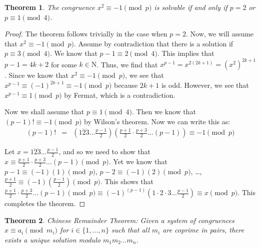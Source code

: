 \documentclass[psamsfonts]{amsart}
\newtheorem{thm}{Theorem}[section]
\theoremstyle{definition}
\theoremstyle{remark}
\numberwithin{equation}{section}
\begin{document}
\begin{thm}
The congruence $x^2 \equiv - 1 \pmod{p}$ is solvable if and only if $p = 2$ or $p \equiv 1 \pmod{4}$. 
\end{thm}

\begin{proof}
The theorem follows trivially in the case when $p = 2$. Now, we will assume that $x^2 \equiv -1 \pmod{p}$. Assume by contradiction that there is a solution if $p \equiv 3 \pmod{4}$. We know that $p-1 \equiv 2 \pmod{4}$. This implies that $p-1 = 4k + 2$ for some $k \in \mathrm{N}$. Thus, we find that $x^{p-1} = x^{2(2k+1)} = (x^2)^{2k+1}$. Since we know that $x^2 \equiv -1 \pmod{p}$, we see that $x^{p-1} \equiv (-1)^{2k+1} \equiv -1 \pmod{p}$ because $2k+1$ is odd. However, we see that $x^{p-1} \equiv 1 \pmod{p}$ by Fermat, which is a contradiction.

Now we shall assume that $p \equiv 1 \pmod{4}$. Then we know that $(p-1)! \equiv - 1 \pmod{p}$ by Wilson's theorem. Now we can write this as:
\begin{eqnarray}
(p-1)! &=& \left(1 \ddot 2 \ddot 3 \ldots \frac{p-1}{2} \right) \left( \frac{p+1}{2} \cdot \frac{p+3}{2} \ldots (p-1) \right) \equiv -1 \pmod{p}
\end{eqnarray}

Let $x = 1 \ddot 2 \ddot 3 \ldots \frac{p-1}{2}$, and so we need to show that $x \equiv \frac{p+1}{2} \cdot \frac{p+3}{2} \ldots (p-1) \pmod{p}$. Yet we know that $p - 1 \equiv (-1)(1) \pmod{p}$, $p-2 \equiv (-1)(2) \pmod{p}$, \ldots, $\frac{p+1}{2} \equiv (-1)(\frac{p-1}{2}) \pmod{p}$. This shows that $ \frac{p+1}{2} \cdot \frac{p+3}{2} \ldots (p-1) \pmod{p} \equiv (-1)^(p-1) (1 \cdot 2 \cdot 3 \ldots \frac{p-1}{2} ) \equiv x \pmod{p}$. This completes the theorem.
\end{proof}

\begin{thm}
Chinese Remainder Theorem: Given a system of congruences $x \equiv a_i \pmod{m_i}$ for $i \in \{1, \ldots, n\}$ such that all $m_i$ are coprime in pairs, there exists a unique solution modulo $m_1 m_2 \ldots m_n$.
\end{thm}
\end{document}
